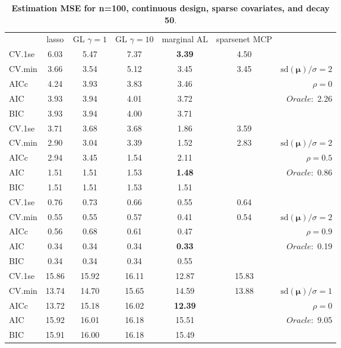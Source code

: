 \clearpage
\begin{table}\vspace{-.5cm}
\caption[l]{ { \bf Estimation MSE for n=100, continuous design, 
sparse covariates, and  decay  50}.}
\vspace{-.5cm}
\footnotesize{}
\begin{center}
\begin{tabular}{l*{5}{c}|r}
& lasso & GL $\gamma=1$ & GL $\gamma=10$ & marginal AL & sparsenet MCP  & \\
 \cline{1-7}
CV.1se & 6.03 & 5.47 & 7.37 & {\bf 3.39} & 4.50 & \\
CV.min & 3.66 & 3.54 & 5.12 & 3.45 & 3.45 &  $\mathrm{sd}(\mathbf{\mu})/\sigma=2$ \\
AICc & 4.24 & 3.93 & 3.83 & 3.46 & & $\rho=0$ \\
AIC & 3.93 & 3.94 & 4.01 & 3.72 & &  \multirow{2}{*}{$Oracle: $ 2.26} \\
BIC & 3.93 & 3.94 & 4.00 & 3.71 & &  \\
 \hline 
CV.1se & 3.71 & 3.68 & 3.68 & 1.86 & 3.59 & \\
CV.min & 2.90 & 3.04 & 3.39 & 1.52 & 2.83 &  $\mathrm{sd}(\mathbf{\mu})/\sigma=2$ \\
AICc & 2.94 & 3.45 & 1.54 & 2.11 & & $\rho=0.5$ \\
AIC & 1.51 & 1.51 & 1.53 & {\bf 1.48} & &  \multirow{2}{*}{$Oracle: $ 0.86} \\
BIC & 1.51 & 1.51 & 1.53 & 1.51 & &  \\
 \hline 
CV.1se & 0.76 & 0.73 & 0.66 & 0.55 & 0.64 & \\
CV.min & 0.55 & 0.55 & 0.57 & 0.41 & 0.54 &  $\mathrm{sd}(\mathbf{\mu})/\sigma=2$ \\
AICc & 0.56 & 0.68 & 0.61 & 0.47 & & $\rho=0.9$ \\
AIC & 0.34 & 0.34 & 0.34 & {\bf 0.33} & &  \multirow{2}{*}{$Oracle: $ 0.19} \\
BIC & 0.34 & 0.34 & 0.34 & 0.55 & &  \\
 \hline 
CV.1se & 15.86 & 15.92 & 16.11 & 12.87 & 15.83 & \\
CV.min & 13.74 & 14.70 & 15.65 & 14.59 & 13.88 &  $\mathrm{sd}(\mathbf{\mu})/\sigma=1$ \\
AICc & 13.72 & 15.18 & 16.02 & {\bf 12.39} & & $\rho=0$ \\
AIC & 15.92 & 16.01 & 16.18 & 15.51 & &  \multirow{2}{*}{$Oracle: $ 9.05} \\
BIC & 15.91 & 16.00 & 16.18 & 15.49 & &  \\

\end{tabular}
\end{center}
\end{table}
